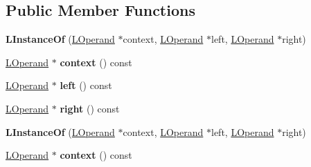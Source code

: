 \subsection*{Public Member Functions}
\begin{DoxyCompactItemize}
\item 
{\bfseries L\+Instance\+Of} (\hyperlink{classv8_1_1internal_1_1_l_operand}{L\+Operand} $\ast$context, \hyperlink{classv8_1_1internal_1_1_l_operand}{L\+Operand} $\ast$left, \hyperlink{classv8_1_1internal_1_1_l_operand}{L\+Operand} $\ast$right)\hypertarget{classv8_1_1internal_1_1_l_instance_of_a8ad0d7b134a9a55d1a38cb1fdfa5c885}{}\label{classv8_1_1internal_1_1_l_instance_of_a8ad0d7b134a9a55d1a38cb1fdfa5c885}

\item 
\hyperlink{classv8_1_1internal_1_1_l_operand}{L\+Operand} $\ast$ {\bfseries context} () const \hypertarget{classv8_1_1internal_1_1_l_instance_of_a1b27b2320dde2f64e3530dc627908888}{}\label{classv8_1_1internal_1_1_l_instance_of_a1b27b2320dde2f64e3530dc627908888}

\item 
\hyperlink{classv8_1_1internal_1_1_l_operand}{L\+Operand} $\ast$ {\bfseries left} () const \hypertarget{classv8_1_1internal_1_1_l_instance_of_a25d3b20c6819feb68c88a83a9f9d5399}{}\label{classv8_1_1internal_1_1_l_instance_of_a25d3b20c6819feb68c88a83a9f9d5399}

\item 
\hyperlink{classv8_1_1internal_1_1_l_operand}{L\+Operand} $\ast$ {\bfseries right} () const \hypertarget{classv8_1_1internal_1_1_l_instance_of_aa76d8ac6252398fda6be50e6458cbe9d}{}\label{classv8_1_1internal_1_1_l_instance_of_aa76d8ac6252398fda6be50e6458cbe9d}

\item 
{\bfseries L\+Instance\+Of} (\hyperlink{classv8_1_1internal_1_1_l_operand}{L\+Operand} $\ast$context, \hyperlink{classv8_1_1internal_1_1_l_operand}{L\+Operand} $\ast$left, \hyperlink{classv8_1_1internal_1_1_l_operand}{L\+Operand} $\ast$right)\hypertarget{classv8_1_1internal_1_1_l_instance_of_a8ad0d7b134a9a55d1a38cb1fdfa5c885}{}\label{classv8_1_1internal_1_1_l_instance_of_a8ad0d7b134a9a55d1a38cb1fdfa5c885}

\item 
\hyperlink{classv8_1_1internal_1_1_l_operand}{L\+Operand} $\ast$ {\bfseries context} () const \hypertarget{classv8_1_1internal_1_1_l_instance_of_a1b27b2320dde2f64e3530dc627908888}{}\label{classv8_1_1internal_1_1_l_instance_of_a1b27b2320dde2f64e3530dc627908888}


\end{DoxyCompactItemize}
